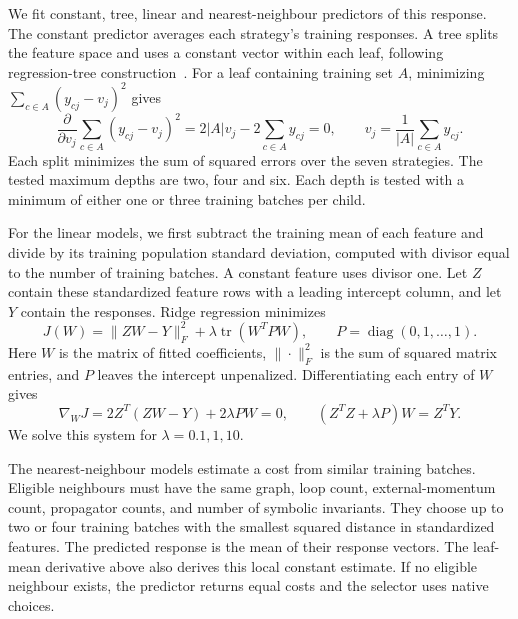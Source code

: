 We fit constant, tree, linear and nearest-neighbour predictors of this
response. The constant predictor averages each strategy's training
responses. A tree splits the feature space and uses a constant vector
within each leaf, following regression-tree construction~\cite{CART1984}.
For a leaf containing training set $A$, minimizing
$\sum_{c\in A}(y_{cj}-v_j)^2$ gives
\begin{equation}
 \frac{\partial}{\partial v_j}
 \sum_{c\in A}(y_{cj}-v_j)^2
 =2|A|v_j-2\sum_{c\in A}y_{cj}=0,
 \qquad v_j=\frac{1}{|A|}\sum_{c\in A}y_{cj}.
\end{equation}
Each split minimizes the sum of squared errors over the seven strategies.
The tested maximum depths are two, four and six. Each depth is tested
with a minimum of either one or three training batches per child.

For the linear models, we first subtract the training mean of each feature and
divide by its training population standard deviation, computed with
divisor equal to the number of training batches. A constant feature uses
divisor one. Let $Z$ contain these standardized feature rows with a leading intercept column, and let $Y$ contain the responses.
Ridge regression minimizes
\begin{equation}
 J(W)=\|ZW-Y\|_F^2+\lambda\operatorname{tr}(W^TPW),
 \qquad P=\operatorname{diag}(0,1,\ldots,1).
\end{equation}
Here $W$ is the matrix of fitted coefficients, $\|\cdot\|_F^2$ is the sum
of squared matrix entries, and $P$ leaves the intercept unpenalized.
Differentiating each entry of $W$ gives
\begin{equation}
 \nabla_WJ=2Z^T(ZW-Y)+2\lambda PW=0,
 \qquad (Z^TZ+\lambda P)W=Z^TY.
\end{equation}
We solve this system for $\lambda=0.1,1,10$.

The nearest-neighbour models estimate a cost from similar training batches. Eligible neighbours must have the same graph, loop count, external-momentum count, propagator counts, and number of symbolic invariants. They choose up to two or four training batches with
the smallest squared distance in standardized features. The predicted
response is the mean of their response vectors. The leaf-mean derivative
above also derives this local constant estimate. If no eligible neighbour
exists, the predictor returns equal costs and the selector uses native
choices.

